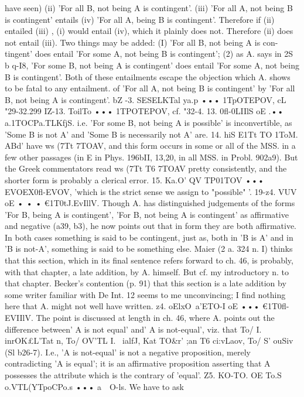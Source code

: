 {{have seen) (ii) 'For all B, not being A is contingent'. (iii) 'For
all A, not being B is contingent' entails (iv) 'For all A, being B
is contingent'. Therefore if (ii) entailed (iii) , (i) would entail
(iv), which it plainly does not. Therefore (ii) does not entail (iii).
Two things may be added: (I) 'For all B, not being A is con-
tingent' does entail 'For some A, not being B is contingent';
(2) as A. says in 2S b q-I8, 'For some B, not being A is contingent'
does entail 'For some A, not being B is contingent'. Both of these
entailments escape the objection which A. shows to be fatal to
any entailment. of 'For all A, not being B is contingent' by 'For
all B, not being A is contingent'.
bZ -3. SESELKTal ya.p ••• 1TpOTEPOV, cL "29-32.299
IZ-13. ToilTo ••• 1TPOTEPOV, cf. "32-4.
13. 0fl-0LIIlS oE .•• a.1TOCPa.TLKfjS. i.e. 'For some B, not being A is
possible' is inconvertible, as 'Some B is not A' and 'Some B is
necessarily not A' are.
14. hiS E1Tt TO 1ToM. ABd' have ws (7Tt 7TOAV, and this form
occurs in some or all of the MSS. in a few other passages (in E
in Phys. 196bII, 13,20, in all MSS. in Probl. 902a9). But the Greek
commentators read ws (7Tt T6 7TOAV pretty consistently, and the
shorter form is probably a clerical error.
15. Ka.O' QV TP01TOV ••• EVOEX0fl-EVOV, 'which is the strict sense
we assign to "possible" '.
19-z4. VUV oE • • • €1T0tJ.EvIllV. Though A. has distinguished
judgements of the forms 'For B, being A is contingent', 'For B,
not being A is contingent' as affirmative and negative (a39, b3),
he now points out that in form they are both affirmative. In both
cases something is said to be contingent, just as, both in 'B is A'
and in 'B is not-A', something is said to be something else.
Maier (2 a. 324 n. I) thinks that this section, which in its final
sentence refers forward to ch. 46, is probably, with that chapter,
a late addition, by A. himself. But cf. my introductory n. to
that chapter. Becker's contention (p. 91) that this section is a
late addition by some writer familiar with De Int. 12 seems to me
unconvincing; I find nothing here that A. might not well have
written.
z4. oElxO~a'ETO-I oE ••• €1T0fl-EVIIlV. The point is discussed at
length in ch. 46, where A. points out the difference between' A is
not equal' and' A is not-equal', viz. that To/ {I.~ inrOK£L'Tat n, To/
OV'TL {I.~ ialfJ, Kat TO&r' ;an T6 ci:vLaov, To/ S' ouSiv (Sl b26-7). I.e.,
'A is not-equal' is not a negative proposition, merely contradicting
'A is equal'; it is an affirmative proposition asserting that A
possesses the attribute which is the contrary of 'equal'.
Z5. KO-TO. OE To.S o.VTL(YTpoCPo.s ••• a~~O-ls. We have to ask
}}}}
